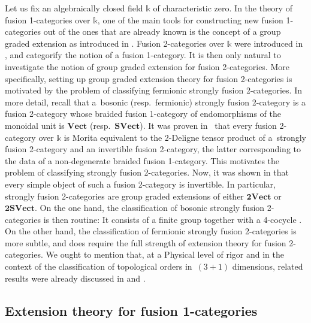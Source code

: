 \documentclass[pdftex]{sigma}
\numberwithin{equation}{section}
\begin{document}
Let us fix an algebraically closed field $\mathds{k}$ of characteristic zero. In the theory of fusion 1-categories over $\mathds{k}$, one of the main tools for constructing new fusion 1-categories out of the ones that are already known is the concept of a group graded extension as introduced in \cite{ENO2}. Fusion 2-ca\-tegories over $\mathds{k}$ were introduced in \cite{DR}, and categorify the notion of a fusion 1-category. It is then only natural to investigate the notion of group graded extension for fusion 2-categories. More specifically, setting up group graded extension theory for fusion 2-categories is motivated by the problem of classifying fermionic strongly fusion 2-categories. In more detail, recall that a~bosonic (resp.\ fermionic) strongly fusion 2-category is a fusion 2-category whose braided fusion 1-category of endomorphisms of the monoidal unit is $\mathbf{Vect}$ (resp.\ $\mathbf{SVect}$). It was proven in~\cite{D9} that every fusion 2-category over $\mathds{k}$ is Morita equivalent to the 2-Deligne tensor product of a~strongly fusion 2-category and an invertible fusion 2-category, the latter corresponding to the data of a non-degenerate braided fusion 1-category. This motivates the problem of classifying strongly fusion 2-categories. Now, it was shown in \cite{JFY} that every simple object of such a fusion 2-category is invertible. In particular, strongly fusion 2-categories are group graded extensions of either $\mathbf{2Vect}$ or $\mathbf{2SVect}$. On the one hand, the classification of bosonic strongly fusion 2-categories is then routine: It consists of a finite group together with a 4-cocycle \cite[Section~2.1]{DR}. On the other hand, the classification of fermionic strongly fusion 2-categories is more subtle, and does require the full strength of extension theory for fusion 2-categories. We ought to mention that, at a Physical level of rigor and in the context of the classification of topological orders in~$(3+1)$ dimensions, related results were already discussed in \cite{LW} and \cite{JF}.

\subsection{Extension theory for fusion 1-categories}
\end{document}
